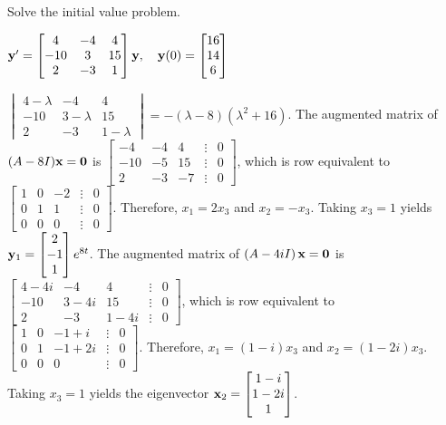 \documentclass{ximera}
\begin{document}
 \begin{problem}\label{exer:10.6.24}
 Solve the initial value problem.
 
$ {\bf y}'= \begin{bmatrix}4&-4&4\\-10&3&15\\2&-3&1\end{bmatrix}{\bf y},\quad
{\bf y}(0)= \begin{bmatrix}16\\14\\6\end{bmatrix}$

\begin{solution}
    $\begin{vmatrix}4-\lambda&-4&4\\-10&3-\lambda&15\\2
&-3&1-\lambda\end{vmatrix}=-(\lambda-8)(\lambda^2+16)$.
 The augmented matrix of $(A-8I){\bf x=0}$ is
$ \begin{bmatrix}-4&-4&4&\vdots&0\\-10&-5&15&\vdots&0\\
2&-3&-7&\vdots&0 \end{bmatrix}$,
which is row equivalent to
$ \begin{bmatrix} 1&0&-2&\vdots&0\\ 0&1&1&
\vdots&0\\ 0&0&0&\vdots&0 \end{bmatrix}$.
Therefore,  $x_1=2x_3$ and $x_2=-x_3$. Taking $x_3=1$ yields
${\bf y}_1= \begin{bmatrix}2\\-1\\1 \end{bmatrix}e^{8t}$.
The augmented matrix of
$\left(A-4iI\right){\bf x=0}$ is
$ \begin{bmatrix}4-4i&-4&4&\vdots&0\\-10&3-4i&15&\vdots&0\\
2&-3&1-4i&\vdots&0 \end{bmatrix}$,
which is row equivalent to
$ \begin{bmatrix}1&0&-1+i&\vdots&0\\
0&1&-1+2i&\vdots&0\\ 0&0&0&\vdots&0 \end{bmatrix}$.
Therefore,  $x_1=(1-i)x_3$ and $x_2=(1-2i)x_3$.
Taking $x_3=1$ yields the eigenvector
${\bf x}_2= \begin{bmatrix}1-i\\1-2i\\1 \end{bmatrix}$.

\end{solution}
\end{problem}
\end{document}
